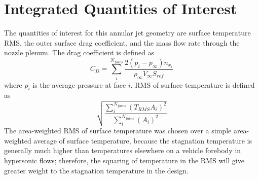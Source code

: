 \section{Integrated Quantities of Interest}

The quantities of interest for this annular jet geometry are surface temperature
RMS, the outer surface drag coefficient, and the mass flow rate through the
nozzle plenum.  The drag coefficient is defined as
\begin{equation}
  C_D = \sum_{i}^{N_{faces}}
        \frac{2\left( p_i - p_\infty \right)n_{x_{i}}}
        {\rho_{\infty} V_{\infty}S_{ref}}
  \label{drag-coef-def}
\end{equation}
where $p_i$ is the average pressure at face $i$.  RMS of surface temperature is
defined as
\begin{equation}
  \sqrt{
    \frac{\sum_{i}^{N_{faces}}\left( T_{RMS} A_i \right)^2}
       {\sum_{i}^{N_{faces}}\left( A_i \right)^2}
     }
  \label{tt-rms-def}
\end{equation}
The area-weighted RMS of surface temperature was chosen over a simple
area-weighted average of surface temperature, because the stagnation temperature
is generally much higher than temperatures elsewhere on a vehicle forebody in
hypersonic flows; therefore, the squaring of temperature in the RMS will give
greater weight to the stagnation temperature in the design.


